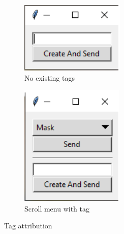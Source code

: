 \documentclass[a4paper,12pt]{article}
\begin{document}
\begin{figure}%
    \centering
    \begin{subfigure}{4cm}
        \includegraphics[width=\linewidth]{images_latex/Empty_tag.png}
        \caption{No existing tags}
        \label{fig:no_tag}
    \end{subfigure}
    \qquad
    \begin{subfigure}{4cm}
        \includegraphics[width=\linewidth]{images_latex/Tag_choice.png}
        \caption{Scroll menu with tag}
        \label{fig:scrol_tag}
    \end{subfigure}
    \caption{Tag attribution}%
    \label{fig:tag_attrib}%
\end{figure}
\end{document}
